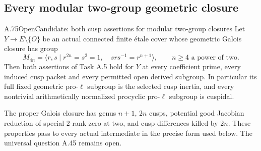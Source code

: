 \subsection{Every modular two-group geometric closure}

\begin{statement}{A.75}{Open}{Candidate: both cusp assertions for modular two-group closures}
Let \(Y\to E\setminus\{O\}\) be an actual connected finite
\'{e}tale cover whose geometric Galois closure has group
\[
 M_{4n}=\langle r,s\mid r^{2n}=s^2=1,\quad
                        srs^{-1}=r^{n+1}\rangle,
 \qquad n\ge4\text{ a power of two}.                 \tag{A.75.1}
\]
Then both assertions of Task A.5 hold for \(Y\) at every
coefficient prime, every induced cusp packet and every permitted
open derived subgroup. In particular its full fixed geometric
pro-\(\ell\) subgroup is the selected cusp inertia, and every
nontrivial arithmetically normalized procyclic pro-\(\ell\)
subgroup is cuspidal.

The proper Galois closure has genus \(n+1\), \(2n\) cusps,
potential good Jacobian reduction of special \(2\)-rank zero
at two, and cusp differences killed by \(2n\). These properties
pass to every actual intermediate in the precise form used below.
The universal question A.45 remains open.
\end{statement}

